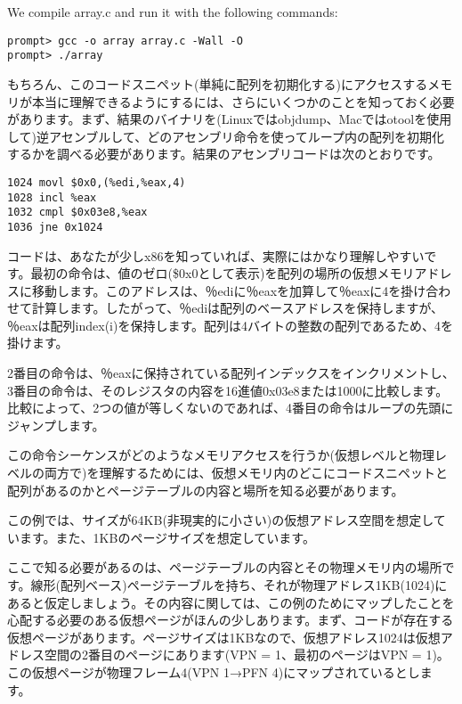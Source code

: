 We compile array.c and run it with the following commands:

\begin{verbatim}
prompt> gcc -o array array.c -Wall -O
prompt> ./array
\end{verbatim}

もちろん、このコードスニペット(単純に配列を初期化する)にアクセスするメモリが本当に理解できるようにするには、さらにいくつかのことを知っておく必要があります。まず、結果のバイナリを(Linuxではobjdump、Macではotoolを使用して)逆アセンブルして、どのアセンブリ命令を使ってループ内の配列を初期化するかを調べる必要があります。結果のアセンブリコードは次のとおりです。

\begin{verbatim}
1024 movl $0x0,(%edi,%eax,4)
1028 incl %eax
1032 cmpl $0x03e8,%eax
1036 jne 0x1024
\end{verbatim}

コードは、あなたが少しx86を知っていれば、実際にはかなり理解しやすいです。最初の命令は、値のゼロ(\$0x0として表示)を配列の場所の仮想メモリアドレスに移動します。このアドレスは、％ediに％eaxを加算して％eaxに4を掛け合わせて計算します。したがって、％ediは配列のベースアドレスを保持しますが、％eaxは配列index(i)を保持します。配列は4バイトの整数の配列であるため、4を掛けます。

2番目の命令は、％eaxに保持されている配列インデックスをインクリメントし、3番目の命令は、そのレジスタの内容を16進値0x03e8または1000に比較します。比較によって、2つの値が等しくないのであれば、4番目の命令はループの先頭にジャンプします。

この命令シーケンスがどのようなメモリアクセスを行うか(仮想レベルと物理レベルの両方で)を理解するためには、仮想メモリ内のどこにコードスニペットと配列があるのか\hspace{0pt}\hspace{0pt}とページテーブルの内容と場所を知る必要があります。

この例では、サイズが64KB(非現実的に小さい)の仮想アドレス空間を想定しています。また、1KBのページサイズを想定しています。

ここで知る必要があるのは、ページテーブルの内容とその物理メモリ内の場所です。線形(配列ベース)ページテーブルを持ち、それが物理アドレス1KB(1024)にあると仮定しましょう。その内容に関しては、この例のためにマップしたことを心配する必要のある仮想ページがほんの少しあります。まず、コードが存在する仮想ページがあります。ページサイズは1KBなので、仮想アドレス1024は仮想アドレス空間の2番目のページにあります(VPN
= 1、最初のページはVPN = 1)。この仮想ページが物理フレーム4(VPN 1→PFN
4)にマップされているとします。

